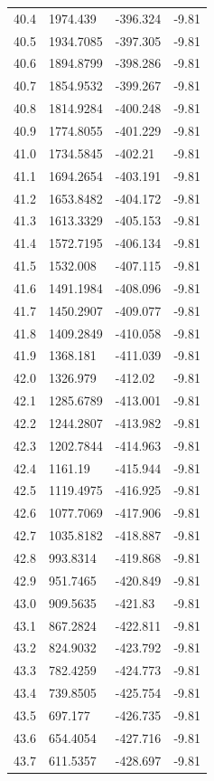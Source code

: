 \begin{table}[H]
\begin{tabular}{llll}
40.4 & 1974.439 & -396.324 & -9.81 \\
40.5 & 1934.7085 & -397.305 & -9.81 \\
40.6 & 1894.8799 & -398.286 & -9.81 \\
40.7 & 1854.9532 & -399.267 & -9.81 \\
40.8 & 1814.9284 & -400.248 & -9.81 \\
40.9 & 1774.8055 & -401.229 & -9.81 \\
41.0 & 1734.5845 & -402.21 & -9.81 \\
41.1 & 1694.2654 & -403.191 & -9.81 \\
41.2 & 1653.8482 & -404.172 & -9.81 \\
41.3 & 1613.3329 & -405.153 & -9.81 \\
41.4 & 1572.7195 & -406.134 & -9.81 \\
41.5 & 1532.008 & -407.115 & -9.81 \\
41.6 & 1491.1984 & -408.096 & -9.81 \\
41.7 & 1450.2907 & -409.077 & -9.81 \\
41.8 & 1409.2849 & -410.058 & -9.81 \\
41.9 & 1368.181 & -411.039 & -9.81 \\
42.0 & 1326.979 & -412.02 & -9.81 \\
42.1 & 1285.6789 & -413.001 & -9.81 \\
42.2 & 1244.2807 & -413.982 & -9.81 \\
42.3 & 1202.7844 & -414.963 & -9.81 \\
42.4 & 1161.19 & -415.944 & -9.81 \\
42.5 & 1119.4975 & -416.925 & -9.81 \\
42.6 & 1077.7069 & -417.906 & -9.81 \\
42.7 & 1035.8182 & -418.887 & -9.81 \\
42.8 & 993.8314 & -419.868 & -9.81 \\
42.9 & 951.7465 & -420.849 & -9.81 \\
43.0 & 909.5635 & -421.83 & -9.81 \\
43.1 & 867.2824 & -422.811 & -9.81 \\
43.2 & 824.9032 & -423.792 & -9.81 \\
43.3 & 782.4259 & -424.773 & -9.81 \\
43.4 & 739.8505 & -425.754 & -9.81 \\
43.5 & 697.177 & -426.735 & -9.81 \\
43.6 & 654.4054 & -427.716 & -9.81 \\
43.7 & 611.5357 & -428.697 & -9.81 \\

\end{tabular}
\end{table}

